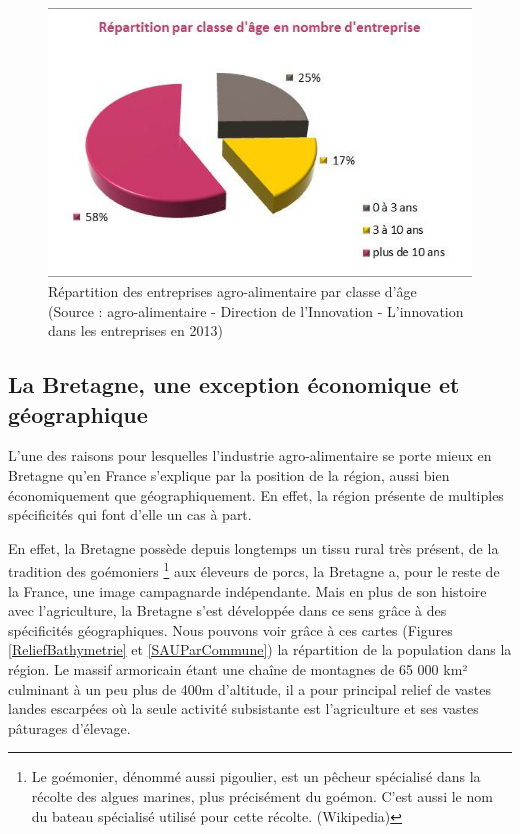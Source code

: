 \documentclass[a4paper,12pt]{report}
\begin{document}
	\begin{figure}[!h]
	\centering
	\includegraphics[scale=1]{Illustrations/RepartitionClasseAge.png}
	\caption{Répartition des entreprises agro-alimentaire par classe d'âge\\(Source : agro-alimentaire - Direction de l’Innovation - L’innovation dans les entreprises en 2013\cite{InnovationEntreprises2013})}
	\label{RepartitionParTaille}
	\end{figure}

		\subsection{La Bretagne, une exception économique et géographique}
			L’une des raisons pour lesquelles l’industrie agro-alimentaire se porte mieux en Bretagne qu’en France s’explique par la position de la région, aussi bien économiquement que géographiquement. En effet, la région présente de multiples spécificités qui font d’elle un cas à part.
			
			En effet, la Bretagne possède depuis longtemps un tissu rural très présent, de la tradition des goémoniers \footnote{Le goémonier, dénommé aussi pigoulier, est un pêcheur spécialisé dans la récolte des algues marines, plus précisément du goémon. C'est aussi le nom du bateau spécialisé utilisé pour cette récolte. (Wikipedia)} aux éleveurs de porcs, la Bretagne a, pour le reste de la France, une image campagnarde indépendante. Mais en plus de son histoire avec l’agriculture, la Bretagne s’est développée dans ce sens grâce à des spécificités géographiques. Nous pouvons voir grâce à ces cartes (Figures \ref{ReliefBathymetrie} et \ref{SAUParCommune}) la répartition de la population dans la région. Le massif armoricain étant une chaîne de montagnes de 65 000 km² culminant à un peu plus de 400m d’altitude, il a pour principal relief de vastes landes escarpées où la seule activité subsistante est l’agriculture et ses vastes pâturages d’élevage.
			
\end{document}
